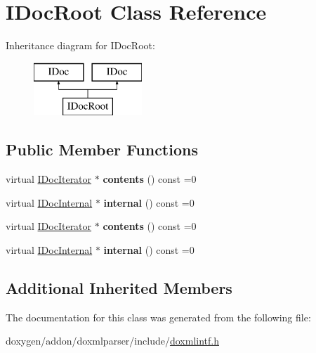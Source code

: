 \hypertarget{class_i_doc_root}{}\section{I\+Doc\+Root Class Reference}
\label{class_i_doc_root}
Inheritance diagram for I\+Doc\+Root\+:\begin{figure}[H]
\begin{center}
\leavevmode
\includegraphics[height=2.000000cm]{class_i_doc_root}
\end{center}
\end{figure}
\subsection*{Public Member Functions}
\begin{DoxyCompactItemize}
\item 
\mbox{\label{class_i_doc_root_ae35b974656d2aac8192a1b9c02e7cfbd}} 
virtual \mbox{\hyperlink{class_i_doc_iterator}{I\+Doc\+Iterator}} $\ast$ {\bfseries contents} () const =0
\item 
\mbox{\label{class_i_doc_root_a05b4b15dd91dd7aea3ba42c2e6635577}} 
virtual \mbox{\hyperlink{class_i_doc_internal}{I\+Doc\+Internal}} $\ast$ {\bfseries internal} () const =0
\item 
\mbox{\label{class_i_doc_root_ae35b974656d2aac8192a1b9c02e7cfbd}} 
virtual \mbox{\hyperlink{class_i_doc_iterator}{I\+Doc\+Iterator}} $\ast$ {\bfseries contents} () const =0
\item 
\mbox{\label{class_i_doc_root_a05b4b15dd91dd7aea3ba42c2e6635577}} 
virtual \mbox{\hyperlink{class_i_doc_internal}{I\+Doc\+Internal}} $\ast$ {\bfseries internal} () const =0
\end{DoxyCompactItemize}
\subsection*{Additional Inherited Members}


The documentation for this class was generated from the following file\+:\begin{DoxyCompactItemize}
\item 
doxygen/addon/doxmlparser/include/\mbox{\hyperlink{include_2doxmlintf_8h}{doxmlintf.\+h}}\end{DoxyCompactItemize}
